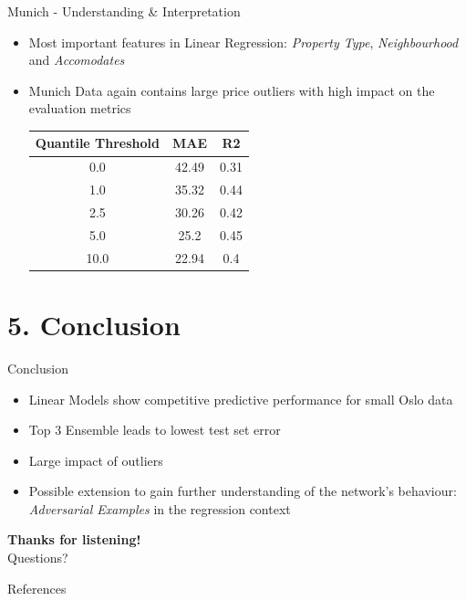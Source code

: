 \documentclass[ngerman,inputenc]{beamer}
\begin{document}
\begin{frame}{Munich - Understanding \& Interpretation}
  \begin{itemize}
    \item Most important features in Linear Regression: \emph{Property Type}, \emph{Neighbourhood} and \emph{Accomodates}
    \item Munich Data again contains large price outliers with high impact on the evaluation metrics
          \vspace{1em}
          \begin{table}[h]
            \centering
            \begin{tabular}{@{}ccc@{}}
              \toprule
              Quantile Threshold & MAE   & R2   \\ \midrule
              0.0                & 42.49 & 0.31 \\
              1.0                & 35.32 & 0.44 \\
              2.5                & 30.26 & 0.42 \\
              5.0                & 25.2  & 0.45 \\
              10.0               & 22.94 & 0.4  \\ \bottomrule
            \end{tabular}
            \label{tab:munich-outliers}
          \end{table}
  \end{itemize}
\end{frame}


\section{5. Conclusion}

\begin{frame}{Conclusion}
  \begin{itemize}
    \item Linear Models show competitive predictive performance for small Oslo data
    \item Top 3 Ensemble leads to lowest test set error
    \item Large impact of outliers
    \item Possible extension to gain further understanding of the network's behaviour: \emph{Adversarial Examples} in the regression context
  \end{itemize}
\end{frame}


\begin{frame}

  \begin{center}
    \LARGE{\textbf{Thanks for listening!}}\\[10mm]
    \large{Questions?}
  \end{center}

\end{frame}

\begin{frame}{References}
  \tiny
  \nocite{he2015, ioffe2015,kingma2014,kingma2017,srivastava2014,goodfellow2015}
  
  
\end{frame}
\end{document}
